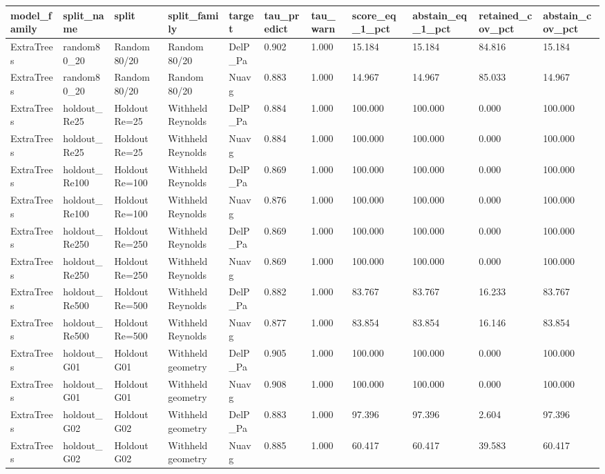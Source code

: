 \begin{tabular}{lllllllllll}
\hline
model_family & split_name & split & split_family & target & tau_predict & tau_warn & score_eq_1_pct & abstain_eq_1_pct & retained_cov_pct & abstain_cov_pct \\
\hline
ExtraTrees & random80_20 & Random 80/20 & Random 80/20 & DelP_Pa & 0.902 & 1.000 & 15.184 & 15.184 & 84.816 & 15.184 \\
ExtraTrees & random80_20 & Random 80/20 & Random 80/20 & Nuavg & 0.883 & 1.000 & 14.967 & 14.967 & 85.033 & 14.967 \\
ExtraTrees & holdout_Re25 & Holdout Re=25 & Withheld Reynolds & DelP_Pa & 0.884 & 1.000 & 100.000 & 100.000 & 0.000 & 100.000 \\
ExtraTrees & holdout_Re25 & Holdout Re=25 & Withheld Reynolds & Nuavg & 0.884 & 1.000 & 100.000 & 100.000 & 0.000 & 100.000 \\
ExtraTrees & holdout_Re100 & Holdout Re=100 & Withheld Reynolds & DelP_Pa & 0.869 & 1.000 & 100.000 & 100.000 & 0.000 & 100.000 \\
ExtraTrees & holdout_Re100 & Holdout Re=100 & Withheld Reynolds & Nuavg & 0.876 & 1.000 & 100.000 & 100.000 & 0.000 & 100.000 \\
ExtraTrees & holdout_Re250 & Holdout Re=250 & Withheld Reynolds & DelP_Pa & 0.869 & 1.000 & 100.000 & 100.000 & 0.000 & 100.000 \\
ExtraTrees & holdout_Re250 & Holdout Re=250 & Withheld Reynolds & Nuavg & 0.869 & 1.000 & 100.000 & 100.000 & 0.000 & 100.000 \\
ExtraTrees & holdout_Re500 & Holdout Re=500 & Withheld Reynolds & DelP_Pa & 0.882 & 1.000 & 83.767 & 83.767 & 16.233 & 83.767 \\
ExtraTrees & holdout_Re500 & Holdout Re=500 & Withheld Reynolds & Nuavg & 0.877 & 1.000 & 83.854 & 83.854 & 16.146 & 83.854 \\
ExtraTrees & holdout_G01 & Holdout G01 & Withheld geometry & DelP_Pa & 0.905 & 1.000 & 100.000 & 100.000 & 0.000 & 100.000 \\
ExtraTrees & holdout_G01 & Holdout G01 & Withheld geometry & Nuavg & 0.908 & 1.000 & 100.000 & 100.000 & 0.000 & 100.000 \\
ExtraTrees & holdout_G02 & Holdout G02 & Withheld geometry & DelP_Pa & 0.883 & 1.000 & 97.396 & 97.396 & 2.604 & 97.396 \\
ExtraTrees & holdout_G02 & Holdout G02 & Withheld geometry & Nuavg & 0.885 & 1.000 & 60.417 & 60.417 & 39.583 & 60.417 \\

\end{tabular}
